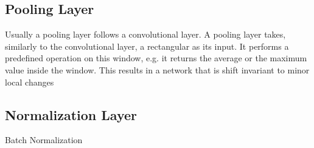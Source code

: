 \subsection{Pooling Layer}
Usually a pooling layer follows a convolutional layer. A pooling layer takes, similarly to the convolutional layer, a rectangular as its input. It performs a predefined operation on this window, e.g. it returns the average or the maximum value inside the window. This results in a network that is shift invariant to minor local changes

\subsection{Normalization Layer}
Batch Normalization





















